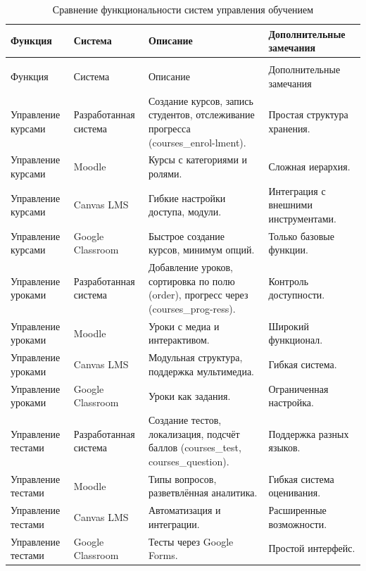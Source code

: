 \begin{xltabular}{\textwidth}{|p{3.1cm}|p{3.1cm}|p{3.5cm}|X|}
	\caption{Сравнение функциональности систем управления обучением\label{comparison:table}}\\ \hline
	Функция & Система & Описание & Дополнительные замечания \\ \hline
	\endfirsthead
	\\ \hline
	Функция & Система & Описание & Дополнительные замечания \\ \hline
	\endhead
	Управление курсами & Разработанная система & Создание курсов, запись студентов, отслеживание прогресса (courses\_enrol-lment). & Простая структура хранения. \\ \hline
	Управление курсами & Moodle & Курсы с категориями и ролями. & Сложная иерархия. \\ \hline
	Управление курсами & Canvas LMS & Гибкие настройки доступа, модули. & Интеграция с внешними инструментами. \\ \hline
	Управление курсами & Google Classroom & Быстрое создание курсов, минимум опций. & Только базовые функции. \\ \hline
	
	Управление уроками & Разработанная система & Добавление уроков, сортировка по полю (order), прогресс через (courses\_prog-ress). & Контроль доступности. \\ \hline
	Управление уроками & Moodle & Уроки с медиа и интерактивом. & Широкий функционал. \\ \hline
	Управление уроками & Canvas LMS & Модульная структура, поддержка мультимедиа. & Гибкая система. \\ \hline
	Управление уроками & Google Classroom & Уроки как задания. & Ограниченная настройка. \\ \hline
	
	Управление тестами & Разработанная система & Создание тестов, локализация, подсчёт баллов (courses\_test, courses\_question). & Поддержка разных языков. \\ \hline
	Управление тестами & Moodle & Типы вопросов, разветвлённая аналитика. & Гибкая система оценивания. \\ \hline
	Управление тестами & Canvas LMS & Автоматизация и интеграции. & Расширенные возможности. \\ \hline
	Управление тестами & Google Classroom & Тесты через Google Forms. & Простой интерфейс. \\ \hline
	

\end{xltabular}
